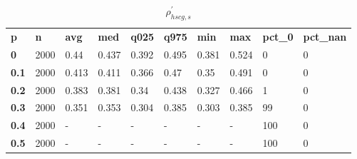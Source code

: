 \begin{table}[h]
 \centering 
\footnotesize
\caption{$\rho_{hscg,s}^\prime $}
\label{tab:alphahscgs}
\begin{tabular}[h]{| l l l l l l l l l l|
    } \hline
\textbf{ p} & \textbf{ n} & \textbf{ avg} & \textbf{ med} & \textbf{ q025} & \textbf{ q975} & \textbf{ min} & \textbf{ max} & \textbf{ pct\_0} & \textbf{ pct\_nan}
           \\
  \textbf{  0} & 2000 &  0.44 & 0.437 & 0.392 & 0.495 & 0.381 & 0.524 &   0 & 0
           \\
  \textbf{0.1} & 2000 & 0.413 & 0.411 & 0.366 &  0.47 &  0.35 & 0.491 &   0 & 0
           \\
  \textbf{0.2} & 2000 & 0.383 & 0.381 &  0.34 & 0.438 & 0.327 & 0.466 &   1 & 0
           \\
  \textbf{0.3} & 2000 & 0.351 & 0.353 & 0.304 & 0.385 & 0.303 & 0.385 &  99 & 0
           \\
  \textbf{0.4} & 2000 & - & - & - & - & - & - & 100 & 0
           \\
  \textbf{0.5} & 2000 & - & - & - & - & - & - & 100 & 0
           \\
 \hline \end{tabular}
 \end{table}
